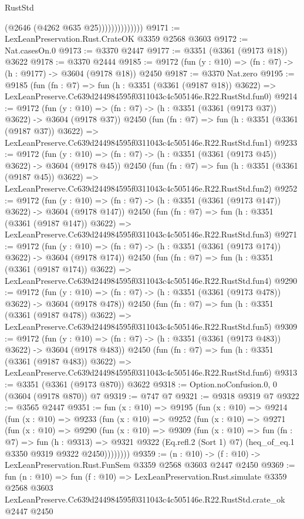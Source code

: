 \begin{lexlean}{RustStd}
\begin{coremodule}
                            (@2646 (@4262 @635 @25))))))))))))))
@9171 := LexLeanPreservation.Rust.CrateOK @3359 @2568 @3603
@9172 := Nat.casesOn.{0}
@9173 := @3370 @2447
@9177 := @3351 (@3361 (@9173 @18)) @3622
@9178 := @3370 @2444
@9185 := @9172 (fun (y : @10) => (fn : @7) -> (h : @9177) -> @3604 (@9178 @18)) @2450
@9187 := @3370 Nat.zero
@9195 := @9185
    (fun (fn : @7) =>
    fun (h : @3351 (@3361 (@9187 @18)) @3622) =>
    LexLeanPreserve.Cc639d244984595f0311043c4c505146e.R22.RustStd.fun0)
@9214 := @9172
    (fun (y : @10) => (fn : @7) -> (h : @3351 (@3361 (@9173 @37)) @3622) -> @3604 (@9178 @37))
    @2450
    (fun (fn : @7) =>
    fun (h : @3351 (@3361 (@9187 @37)) @3622) =>
    LexLeanPreserve.Cc639d244984595f0311043c4c505146e.R22.RustStd.fun1)
@9233 := @9172
    (fun (y : @10) => (fn : @7) -> (h : @3351 (@3361 (@9173 @45)) @3622) -> @3604 (@9178 @45))
    @2450
    (fun (fn : @7) =>
    fun (h : @3351 (@3361 (@9187 @45)) @3622) =>
    LexLeanPreserve.Cc639d244984595f0311043c4c505146e.R22.RustStd.fun2)
@9252 := @9172
    (fun (y : @10) => (fn : @7) -> (h : @3351 (@3361 (@9173 @147)) @3622) -> @3604 (@9178 @147))
    @2450
    (fun (fn : @7) =>
    fun (h : @3351 (@3361 (@9187 @147)) @3622) =>
    LexLeanPreserve.Cc639d244984595f0311043c4c505146e.R22.RustStd.fun3)
@9271 := @9172
    (fun (y : @10) => (fn : @7) -> (h : @3351 (@3361 (@9173 @174)) @3622) -> @3604 (@9178 @174))
    @2450
    (fun (fn : @7) =>
    fun (h : @3351 (@3361 (@9187 @174)) @3622) =>
    LexLeanPreserve.Cc639d244984595f0311043c4c505146e.R22.RustStd.fun4)
@9290 := @9172
    (fun (y : @10) => (fn : @7) -> (h : @3351 (@3361 (@9173 @478)) @3622) -> @3604 (@9178 @478))
    @2450
    (fun (fn : @7) =>
    fun (h : @3351 (@3361 (@9187 @478)) @3622) =>
    LexLeanPreserve.Cc639d244984595f0311043c4c505146e.R22.RustStd.fun5)
@9309 := @9172
    (fun (y : @10) => (fn : @7) -> (h : @3351 (@3361 (@9173 @483)) @3622) -> @3604 (@9178 @483))
    @2450
    (fun (fn : @7) =>
    fun (h : @3351 (@3361 (@9187 @483)) @3622) =>
    LexLeanPreserve.Cc639d244984595f0311043c4c505146e.R22.RustStd.fun6)
@9313 := @3351 (@3361 (@9173 @870)) @3622
@9318 := Option.noConfusion.{0, 0} (@3604 (@9178 @870)) @7
@9319 := @747 @7
@9321 := @9318 @9319 @7
@9322 := @3565 @2447
@9351 := fun (x : @10) =>
  @9195
    (fun (x : @10) =>
    @9214
      (fun (x : @10) =>
      @9233
        (fun (x : @10) =>
        @9252
          (fun (x : @10) =>
          @9271
            (fun (x : @10) =>
            @9290
              (fun (x : @10) =>
              @9309
                (fun (x : @10) =>
                fun (fn : @7) =>
                fun (h : @9313) =>
                @9321 @9322 (Eq.refl.{2} (Sort 1) @7) (heq_of_eq.{1} @3350 @9319 @9322 @2450))))))))
@9359 := (n : @10) -> (f : @10) -> LexLeanPreservation.Rust.FunSem @3359 @2568 @3603 @2447 @2450
@9369 := fun (n : @10) =>
  fun (f : @10) =>
  LexLeanPreservation.Rust.simulate
    @3359
    @2568
    @3603
    LexLeanPreserve.Cc639d244984595f0311043c4c505146e.R22.RustStd.crate_ok
    @2447
    @2450
\end{coremodule}
\end{lexlean}
